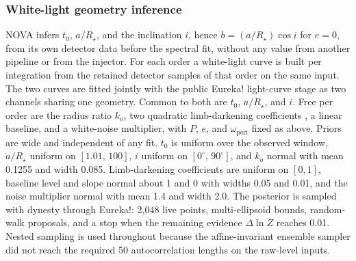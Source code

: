 \subsubsection{White-light geometry inference}
\label{sec:own-white}


NOVA infers $t_0$, $a/R_\star$, and the inclination $i$, hence
$b=(a/R_\star)\cos i$ for $e=0$, from its own detector data before the
spectral fit, without any value from another pipeline or from the
injector. For each order a white-light curve is built per integration
from the retained detector samples of that order on the same input. The
two curves are fitted jointly with the public Eureka! light-curve stage
\citep{BellEtAl2022} as two channels sharing one geometry. Common to
both are $t_0$, $a/R_\star$, and $i$. Free per order are the radius
ratio $k_o$, two quadratic limb-darkening coefficients
\citep{MandelAgol2002}, a linear baseline, and a white-noise multiplier,
with $P$, $e$, and $\omega_{\mathrm{peri}}$ fixed as above. Priors are
wide and independent of any fit. $t_0$ is uniform over the observed
window, $a/R_\star$ uniform on $[1.01,\,100]$, $i$ uniform on
$[0^\circ,\,90^\circ]$, and $k_o$ normal with mean 0.1255 and width
0.085. Limb-darkening coefficients are uniform on $[0,1]$, baseline
level and slope normal about 1 and 0 with widths 0.05 and 0.01, and the
noise multiplier normal with mean 1.4 and width 2.0. The posterior is
sampled with dynesty \citep{Speagle2020} through Eureka!: 2{,}048 live
points, multi-ellipsoid bounds, random-walk proposals, and a stop when
the remaining evidence $\Delta\ln Z$ reaches 0.01. Nested sampling is
used throughout because the affine-invariant ensemble sampler
\citep{ForemanMackeyEtAl2013} did not reach the required 50
autocorrelation lengths on the raw-level inputs.

